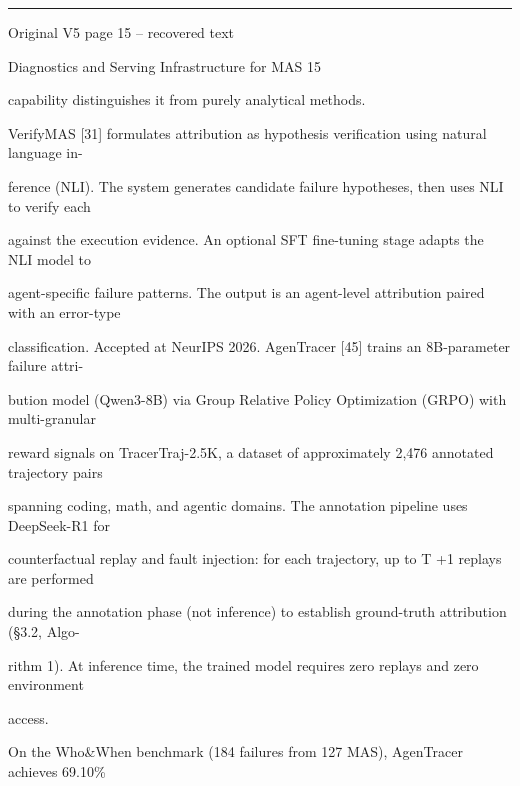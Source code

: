 \par\smallskip\noindent\rule{\textwidth}{0.4pt}\par{\sffamily\footnotesize Original V5 page 15 -- recovered text}\par\begin{flushleft}\footnotesize\ttfamily
\par\smallskip
\par\smallskip
\noindent Diagnostics and Serving Infrastructure for MAS 15\par
\par\smallskip
\par\smallskip
\par\smallskip
\noindent capability distinguishes it from purely analytical methods.\par
\noindent  VerifyMAS [31] formulates attribution as hypothesis verification using natural language in-\par
\noindent ference (NLI). The system generates candidate failure hypotheses, then uses NLI to verify each\par
\noindent against the execution evidence. An optional SFT fine-tuning stage adapts the NLI model to\par
\noindent agent-specific failure patterns. The output is an agent-level attribution paired with an error-type\par
\noindent classification. Accepted at NeurIPS 2026. AgenTracer [45] trains an 8B-parameter failure attri-\par
\noindent bution model (Qwen3-8B) via Group Relative Policy Optimization (GRPO) with multi-granular\par
\noindent reward signals on TracerTraj-2.5K, a dataset of approximately 2,476 annotated trajectory pairs\par
\noindent spanning coding, math, and agentic domains. The annotation pipeline uses DeepSeek-R1 for\par
\noindent counterfactual replay and fault injection: for each trajectory, up to T +1 replays are performed\par
\noindent during the annotation phase (not inference) to establish ground-truth attribution (§3.2, Algo-\par
\noindent rithm 1). At inference time, the trained model requires zero replays and zero environment\par
\noindent access.\par
\noindent  On the Who\&When benchmark (184 failures from 127 MAS), AgenTracer achieves 69.10\%\par

\end{flushleft}
